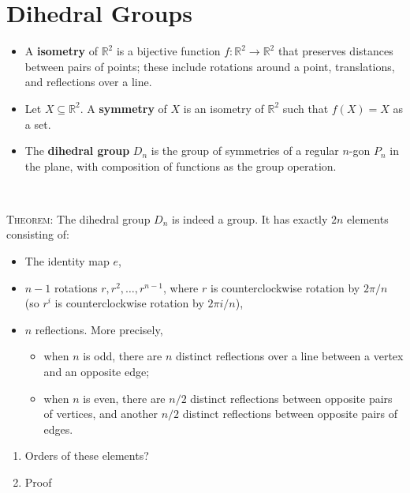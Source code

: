 \documentclass[12pt]{amsart}
\newcommand{\Bold}[1]{\contour{black}{#1}}
\newcommand{\showsol}[1]{\def\displaysol{#1}}
\newcommand\itemA{\stepcounter{enumi}\item[{\Bold{(\theenumi)}}]}
\begin{document}
\showsol{0}
	
	\thispagestyle{empty}
	
	\section*{Dihedral Groups}
	
	

\begin{framed}
\begin{itemize}
\item A \textbf{isometry} of $\mathbb{R}^2$ is a bijective function $f:\mathbb{R}^2 \to \mathbb{R}^2$ that preserves distances between pairs of points; these include rotations around a point, translations, and reflections over a line.

\item Let $X\subseteq \mathbb{R}^2$. A \textbf{symmetry} of $X$ is an isometry of $\mathbb{R}^2$ such that $f(X)=X$ as a set.

\item The \textbf{dihedral group} $D_n$ is the group of symmetries of a regular $n$-gon $P_n$ in the plane, with composition of functions as the group operation.
\end{itemize}


\


\textsc{Theorem:} The dihedral group $D_n$ is indeed a group. It has exactly $2n$ elements consisting of:
\begin{itemize} 
\item The identity map $e$,
\item $n-1$ rotations $r, r^2, \dots, r^{n-1}$, where $r$ is counterclockwise rotation by $2\pi/n$ (so $r^i$ is counterclockwise rotation by $2\pi i/n$),
\item $n$ reflections. More precisely, 
\begin{itemize} 
\item when $n$ is odd, there are $n$ distinct reflections over a line between a vertex and an opposite edge;
\item when $n$ is even, there are $n/2$ distinct reflections between opposite pairs of vertices, and another $n/2$ distinct reflections between opposite pairs of edges.
\end{itemize}
\end{itemize}
\end{framed}

\begin{enumerate}
\itemA Orders of these elements?
\itemA Proof
\end{enumerate}
\end{document}
